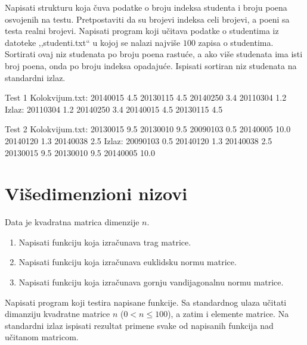 \begin{Exercise}[label=313]
Napisati strukturu  koja čuva podatke o broju
indeksa studenta i broju poena osvojenih na testu. Pretpostaviti
da su brojevi indeksa celi brojevi, a poeni sa testa realni
brojevi. Napisati program koji učitava podatke o studentima iz
datoteke ,,studenti.txt`` u kojoj se nalazi najviše $100$
zapisa o studentima. Sortirati ovaj niz studenata po broju poena
rastuće, a ako više studenata ima isti broj poena, onda po
broju indeksa opadajuće. Ispisati sortiran niz studenata na
standardni izlaz.

\begin{miditest}
\begin{test}{Test 1}
Kolokvijum.txt:   20140015 4.5
                  20130115 4.5
                  20140250 3.4
                  20110304 1.2
Izlaz:            20110304 1.2
                  20140250 3.4
                  20140015 4.5
                  20130115 4.5
\end{test}
\end{miditest}

\begin{miditest}
\begin{test}{Test 2}
Kolokvijum.txt:   20130015 9.5
                  20130010 9.5
                  20090103 0.5
                  20140005 10.0
                  20140120 1.3
                  20140038 2.5
Izlaz:            20090103 0.5
                  20140120 1.3
                  20140038 2.5
                  20130015 9.5
                  20130010 9.5
                  20140005 10.0
\end{test}
\end{miditest}
\end{Exercise}
\begin{Answer}[ref=313]
\end{Answer}

\section{Višedimenzioni nizovi}

\begin{Exercise}[label=314]
Data je kvadratna matrica dimenzije $n$.
\begin{enumerate}
\item Napisati funkciju koja izračunava trag matrice.
\item Napisati funkciju koja izračunava euklidsku normu matrice.
\item Napisati funkciju koja izračunava gornju vandijagonalnu normu matrice.
\end{enumerate}
Napisati program koji testira napisane funkcije. Sa standardnog
ulaza učitati dimanziju kvadratne matrice $n$
($0<n\leq 100$), a zatim i elemente matrice. Na standardni izlaz
ispisati rezultat primene svake od napisanih funkcija nad
učitanom matricom.
\end{Exercise}
\begin{Answer}[ref=314]
\end{Answer}

